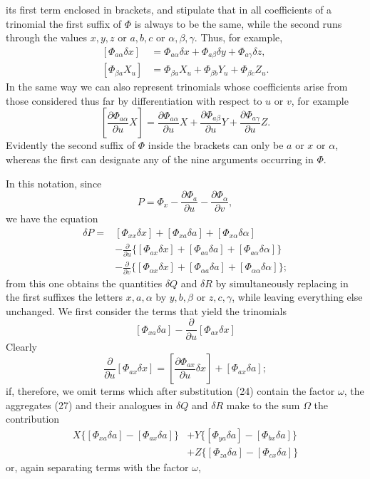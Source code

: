 \documentclass[11pt,a4paper,leqno]{article}
\begin{document}
its first term enclosed in brackets, and stipulate that in all coefficients
of a trinomial the first suffix of $\Phi$ is always to be the same, while
the second runs through the values $x,y,z$ or $a,b,c$ or
$\alpha,\beta,\gamma$. Thus, for example,
\[
\begin{aligned}
[\Phi_{a\alpha}\delta x]&=\Phi_{a\alpha}\delta x+\Phi_{a\beta}\delta y
+\Phi_{a\gamma}\delta z,\\
[\Phi_{\beta a}X_u]&=\Phi_{\beta a}X_u+\Phi_{\beta b}Y_u
+\Phi_{\beta c}Z_u.
\end{aligned}
\]
In the same way we can also represent trinomials whose coefficients arise
from those considered thus far by differentiation with respect to $u$ or
$v$, for example
\[
\left[\frac{\partial\Phi_{a\alpha}}{\partial u}X\right]
=\frac{\partial\Phi_{a\alpha}}{\partial u}X
+\frac{\partial\Phi_{a\beta}}{\partial u}Y
+\frac{\partial\Phi_{a\gamma}}{\partial u}Z.
\]
Evidently the second suffix of $\Phi$ inside the brackets can only be $a$
or $x$ or $\alpha$, whereas the first can designate any of the nine
arguments occurring in $\Phi$.

In this notation, since
\[
P=\Phi_x-\frac{\partial\Phi_a}{\partial u}
-\frac{\partial\Phi_\alpha}{\partial v},
\]
we have the equation
\[
\begin{aligned}
\delta P={}&[\Phi_{xx}\delta x]+[\Phi_{xa}\delta a]
+[\Phi_{x\alpha}\delta\alpha]\\
&-\frac{\partial}{\partial u}
\{[\Phi_{ax}\delta x]+[\Phi_{aa}\delta a]
+[\Phi_{a\alpha}\delta\alpha]\}\\
&-\frac{\partial}{\partial v}
\{[\Phi_{\alpha x}\delta x]+[\Phi_{\alpha a}\delta a]
+[\Phi_{\alpha\alpha}\delta\alpha]\};
\end{aligned}
\]
from this one obtains the quantities $\delta Q$ and $\delta R$ by
simultaneously replacing in the first suffixes the letters $x,a,\alpha$
by $y,b,\beta$ or $z,c,\gamma$, while leaving everything else unchanged.
We first consider the terms that yield the trinomials
\begin{equation}\tag{27}
[\Phi_{xa}\delta a]-\frac{\partial}{\partial u}[\Phi_{ax}\delta x]
\end{equation}
Clearly
\[
\frac{\partial}{\partial u}[\Phi_{ax}\delta x]
=\left[\frac{\partial\Phi_{ax}}{\partial u}\delta x\right]
+[\Phi_{ax}\delta a];
\]
if, therefore, we omit terms which after substitution (24) contain the
factor $\omega$, the aggregates (27) and their analogues in $\delta Q$ and
$\delta R$ make to the sum $\Omega$ the contribution
\[
\begin{aligned}
X\{[\Phi_{xa}\delta a]-[\Phi_{ax}\delta a]\}
&+Y\{[\Phi_{ya}\delta a]-[\Phi_{bx}\delta a]\}\\
&+Z\{[\Phi_{za}\delta a]-[\Phi_{cx}\delta a]\}
\end{aligned}
\]
or, again separating terms with the factor $\omega$,
\end{document}
